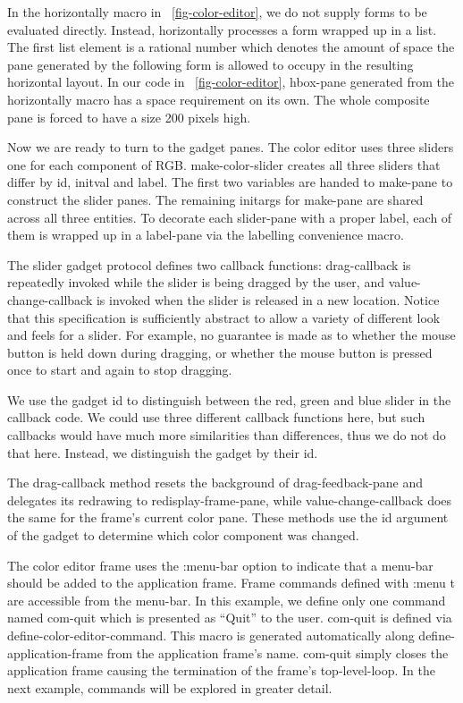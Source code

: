 \documentclass[twocolumn,a4paper]{article}
\newcommand {\code}[1]{{\sffamily #1}}
\let\class\code
\let\method\code
\let\variable\code
\let\macro\code
\let\keyword\code
\begin{document}
In the \macro{horizontally} macro in
\figurename~\ref{fig-color-editor}, we do not supply forms to be
evaluated directly. Instead, \method{horizontally} processes a form
wrapped up in a list. The first list element is a rational number
which denotes the amount of space the pane generated by the following
form is allowed to occupy in the resulting horizontal layout. In our
code in \figurename~\ref{fig-color-editor}, \class{hbox-pane}
generated from the \macro{horizontally} macro has a space requirement
on its own. The whole composite pane is forced to have a size 200
pixels high.

Now we are ready to turn to the gadget panes. The color editor uses
three sliders one for each component of RGB.
\method{make-color-slider} creates all three sliders that differ by
\variable{id}, \variable{initval} and \variable{label}. The first two
variables are handed to \method{make-pane} to construct the slider
panes. The remaining initargs for \method{make-pane} are shared across
all three entities. To decorate each slider-pane with a proper label,
each of them is wrapped up in a \class{label-pane} via the
\macro{labelling} convenience macro.

The slider gadget protocol defines two callback functions:
\method{drag-callback} is repeatedly invoked while the slider is being
dragged by the user, and \method{value-change-callback} is invoked
when the slider is released in a new location. Notice that this
specification is sufficiently abstract to allow a variety of different
look and feels for a slider. For example, no guarantee is made as to
whether the mouse button is held down during dragging, or whether the
mouse button is pressed once to start and again to stop dragging.

We use the gadget id to distinguish between the red, green and blue
slider in the callback code. We could use three different callback
functions here, but such callbacks would have much more similarities
than differences, thus we do not do that here. Instead, we distinguish
the gadget by their \variable{id}.

The \method{drag-callback} method resets the background of
\variable{drag-feedback-pane} and delegates its redrawing to
\method{redisplay-frame-pane}, while \method{value-change-callback}
does the same for the frame's current color pane. These methods use
the \variable{id} argument of the gadget to determine which color
component was changed.

The color editor frame uses the \keyword{:menu-bar} option to indicate
that a menu-bar should be added to the application frame. Frame
commands defined with \code{:menu t} are accessible from the
menu-bar. In this example, we define only one command named
\code{com-quit} which is presented as ``Quit'' to the
user. \code{com-quit} is defined via
\macro{define-color-editor-command}. This macro is generated
automatically along \macro{define-application-frame} from the
application frame's name. \code{com-quit} simply closes the
application frame causing the termination of the frame's
top-level-loop. In the next example, commands will be explored in
greater detail.
\end{document}
